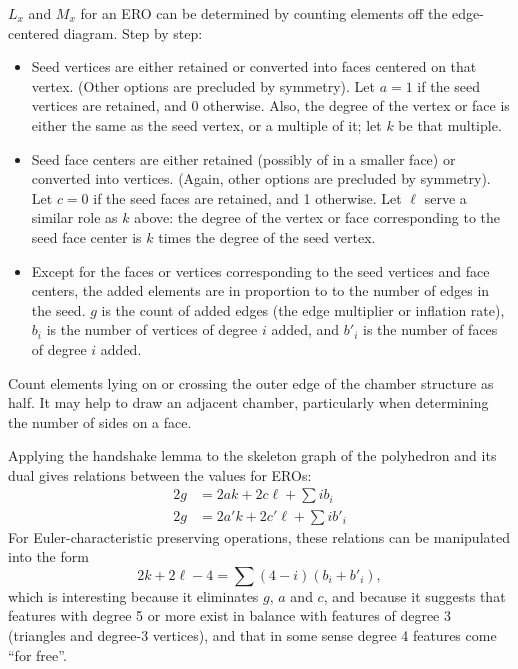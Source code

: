 \documentclass{amsart}[12pt]
\begin{document}
$L_x$ and $M_x$ for an ERO can be determined by counting elements off the
edge-centered diagram. Step by step:
\begin{itemize}
\item Seed vertices are either retained or converted into faces centered on that
  vertex. (Other options are precluded by symmetry). Let $a = 1$ if the
  seed vertices are retained, and 0 otherwise. Also, the degree of the vertex
  or face is either the same as the seed vertex, or a multiple of it;
  let $k$ be that multiple.
\item Seed face centers are either retained (possibly of in a smaller face) or
  converted into vertices. (Again, other options are precluded by symmetry).
  Let $c = 0$ if the seed faces are retained, and 1 otherwise. Let
  $\ell$ serve a similar role as $k$ above: the degree of the vertex
  or face corresponding to the seed face center is $k$ times the degree of
  the seed vertex.
\item Except for the faces or vertices corresponding to the seed vertices and face
  centers, the added elements are in proportion to to the number of edges in the
  seed. $g$ is the count of added edges (the edge multiplier or inflation
  rate), $b_i$ is the number of vertices of degree $i$ added, and
  $b'_i$ is the number of faces of degree $i$ added.
\end{itemize}
Count elements lying on or crossing the outer edge of the chamber structure as
half. It may help to draw an adjacent chamber, particularly when determining
the number of sides on a face.

Applying the handshake lemma to the skeleton graph of the polyhedron and its dual gives relations between the values for EROs:
\begin{equation}
  \begin{split}
   2g &= 2ak + 2c\ell + \sum i b_i \\
   2g &= 2a'k + 2c'\ell + \sum i b'_i
 \end{split}
\end{equation}
For Euler-characteristic preserving operations, these relations can be
manipulated into the form
\begin{equation}
  2k + 2\ell - 4 = \sum (4-i) (b_i + b'_i),
\end{equation}
which is interesting because it eliminates $g$, $a$ and $c$,
and because it suggests that features with degree 5 or more exist
in balance with features of degree 3 (triangles and degree-3 vertices),
and that in some sense degree 4 features come ``for free''.
\end{document}
